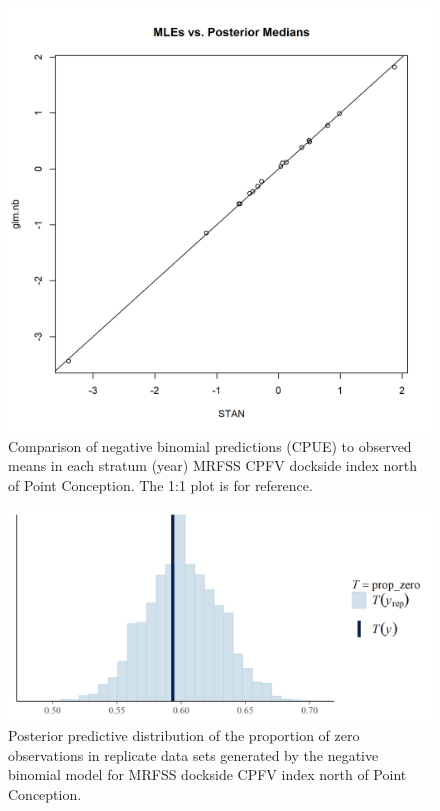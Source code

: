 \documentclass[12pt,]{article}
\begin{document}
\begin{figure}
\centering
\includegraphics{Figures/Fleet10_MLE_stan.png}
\caption{Comparison of negative binomial predictions (CPUE) to observed
means in each stratum (year) MRFSS CPFV dockside index north of Point
Conception. The 1:1 plot is for reference. \label{fig:Fleet10_MLE_stan}}
\end{figure}

\begin{figure}
\centering
\includegraphics{Figures/Fleet10_prop_zero_STAN.png}
\caption{Posterior predictive distribution of the proportion of zero
observations in replicate data sets generated by the negative binomial
model for MRFSS dockside CPFV index north of Point Conception.
\label{fig:Fleet10_prop_zero_STAN}}
\end{figure}
\end{document}

